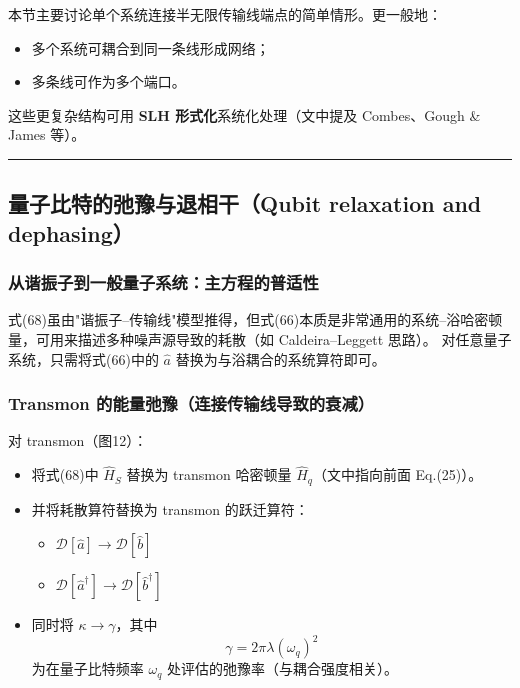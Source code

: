 \documentclass[12pt,a4paper,oneside]{ctexbook}
\begin{document}
本节主要讨论单个系统连接半无限传输线端点的简单情形。更一般地：
\begin{itemize}
  \item 多个系统可耦合到同一条线形成网络；
  \item 多条线可作为多个端口。
\end{itemize}
这些更复杂结构可用 \textbf{SLH 形式化}系统化处理（文中提及 Combes、Gough \& James 等）。

\bigskip\hrule\bigskip

\subsection{量子比特的弛豫与退相干（Qubit relaxation and dephasing）}

\subsubsection{从谐振子到一般量子系统：主方程的普适性}

式(68)虽由"谐振子--传输线"模型推得，但式(66)本质是非常通用的系统--浴哈密顿量，可用来描述多种噪声源导致的耗散（如 Caldeira--Leggett 思路）。
对任意量子系统，只需将式(66)中的 $\hat a$ 替换为与浴耦合的系统算符即可。

\subsubsection{Transmon 的能量弛豫（连接传输线导致的衰减）}

对 transmon（图12）：
\begin{itemize}
  \item 将式(68)中 $\hat H_S$ 替换为 transmon 哈密顿量 $\hat H_q$（文中指向前面 Eq.(25)）。
  \item 并将耗散算符替换为 transmon 的跃迁算符：
  \begin{itemize}
    \item $\mathcal D[\hat a]\to \mathcal D[\hat b]$
    \item $\mathcal D[\hat a^\dagger]\to \mathcal D[\hat b^\dagger]$
  \end{itemize}
  \item 同时将 $\kappa\to\gamma$，其中
  \begin{equation}
  \gamma=2\pi\lambda(\omega_q)^2
  \end{equation}
  为在量子比特频率 $\omega_q$ 处评估的弛豫率（与耦合强度相关）。
\end{itemize}
\end{document}
